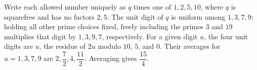 Write each allowed number uniquely as $q$ times one of $1,2,5,10$, where $q$ is squarefree and has no factors $2,5$. The unit digit of $q$ is uniform among $1,3,7,9$: holding all other prime choices fixed, freely including the primes $3$ and $19$ multiplies that digit by $1,3,9,7$, respectively. For a given digit $u$, the four unit digits are $u$, the residue of $2u$ modulo $10$, $5$, and $0$. Their averages for $u=1,3,7,9$ are $2,\dfrac{7}{2},4,\dfrac{11}{2}$. Averaging gives $\boxed{\dfrac{15}{4}}$.
